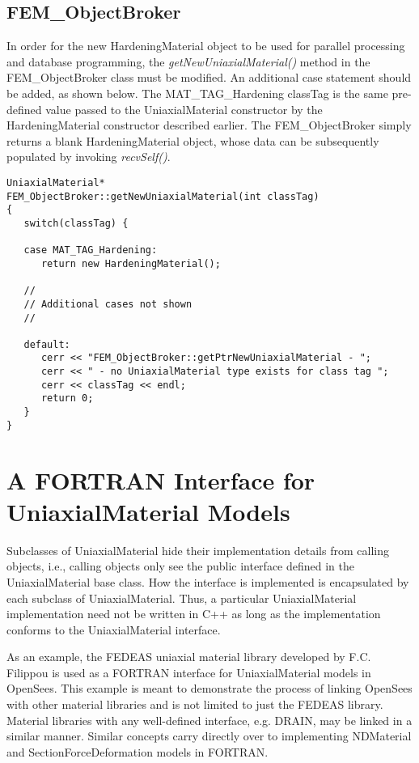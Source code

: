 \documentclass[12pt]{article}
\begin{document}
\subsection{FEM\_ObjectBroker}
In order for the new HardeningMaterial object to be used for parallel processing and
database programming, the {\em getNewUniaxialMaterial()} method in the FEM\_ObjectBroker
class must be modified. An additional case statement should be added, as shown below.
The MAT\_TAG\_Hardening classTag is the same pre-defined value passed to the
UniaxialMaterial constructor by the HardeningMaterial constructor described earlier.
The FEM\_ObjectBroker simply returns a blank HardeningMaterial object, whose data
can be subsequently populated by invoking {\em recvSelf()}.

{\sf\small
\begin{verbatim}
UniaxialMaterial*
FEM_ObjectBroker::getNewUniaxialMaterial(int classTag)
{
   switch(classTag) {

   case MAT_TAG_Hardening:
      return new HardeningMaterial();

   //
   // Additional cases not shown
   //

   default:
      cerr << "FEM_ObjectBroker::getPtrNewUniaxialMaterial - ";
      cerr << " - no UniaxialMaterial type exists for class tag ";
      cerr << classTag << endl;
      return 0;
   }        
}
\end{verbatim}
}

\section{A FORTRAN Interface for UniaxialMaterial Models}
Subclasses of UniaxialMaterial hide their implementation details from calling
objects, i.e., calling objects only see the public interface defined in the UniaxialMaterial
base class. How the interface is implemented is encapsulated by each subclass
of UniaxialMaterial. Thus, a particular UniaxialMaterial implementation
need not be written in C++ as long as the implementation conforms to the UniaxialMaterial
interface.

As an example, the FEDEAS uniaxial material library developed by F.C. Filippou
is used as a FORTRAN interface for
UniaxialMaterial models in OpenSees. This example is meant to demonstrate the process
of linking OpenSees with other material libraries and is not limited to just the
FEDEAS library. Material libraries with any well-defined interface, e.g. DRAIN, may
be linked in a similar manner. Similar concepts carry directly over to
implementing NDMaterial and SectionForceDeformation models in FORTRAN.
\end{document}
